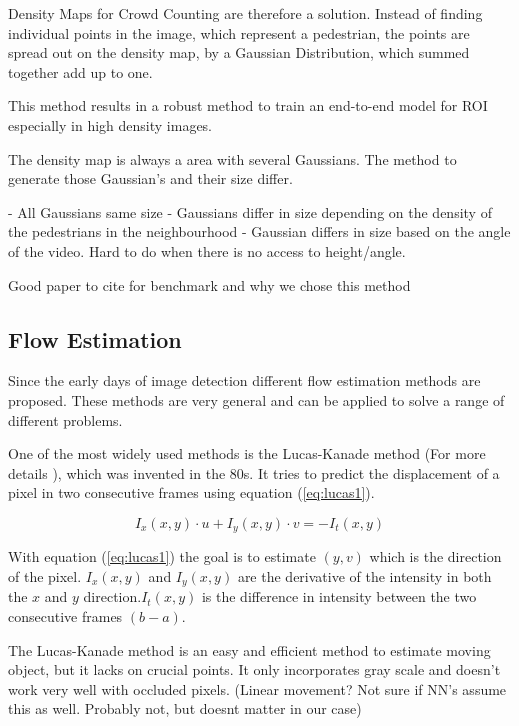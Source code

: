 Density Maps for Crowd Counting are therefore a solution. Instead of finding individual points in the image, which represent a pedestrian, the points are spread out on the density map, by a Gaussian Distribution, which summed together add up to one.

This method results in a robust method to train an end-to-end model for ROI especially in high density images.


The density map is always a area with several Gaussians. The method to generate those Gaussian's and their size differ.

- All Gaussians same size
- Gaussians differ in size depending on the density of the pedestrians in the neighbourhood
- Gaussian differs in size based on the angle of the video. Hard to do when there is no access to height/angle.

Good paper to cite for benchmark and why we chose this method
\cite{wang2020nwpu}
\cite{li2018csrnet}



\subsection{Flow Estimation}
Since the early days of image detection different flow estimation methods are proposed. These methods are very general and can be applied to solve a range of different problems.

One of the most widely used methods is the Lucas-Kanade method (For more details \cite{lucas_kan_nutshell}), which was invented in the 80s. It tries to predict the displacement of a pixel in two consecutive frames using equation (\ref{eq:lucas1}).

\begin{equation} \label{eq:lucas1}
I_x(x, y) \cdot u + I_y(x,y) \cdot v = -I_t(x,y)
\end{equation}

With equation (\ref{eq:lucas1}) the goal is to estimate $(y, v)$ which is the direction of the pixel. $I_x(x, y)$ and $I_y(x, y)$ are the derivative of the intensity in both the $x$ and $y$ direction.$I_t(x, y)$ is the difference in intensity between the two consecutive frames $(b-a)$.

The Lucas-Kanade method is an easy and efficient method to estimate moving object, but it lacks on crucial points. It only incorporates gray scale and doesn't work very well with occluded pixels. (Linear movement? Not sure if NN's assume this as well. Probably not, but doesnt matter in our case)

